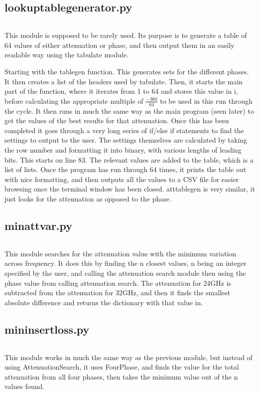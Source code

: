 \documentclass{article}
\begin{document}
\subsection{lookuptablegenerator.py}
\inputminted[linenos, breaklines]{python}{../src/lookuptablegenerator.py}
This module is supposed to be rarely used. Its purpose is to generate a table of 64 values of
either attenuation or phase, and then output them in an easily readable way using the tabulate
module. \par Starting with the tablegen function. This generates sets for the different phases. It
then creates a list of the headers used by tabulate. Then, it starts the main part of the function,
where it iterates from 1 to 64 and stores this value in i, before calculating the appropriate
multiple of $\frac{-360}{64}$ to be used in this run through the cycle. It then runs in much the
same way as the main program (seen later) to get the values of the best results for that
attenuation. Once this has been completed it goes through a very long series of if/else if
statements to find the settings to output to the user. The settings themselves are calculated by
taking the row number and formatting it into binary, with various lengths of leading bits. This
starts on line 83. The relevant values are added to the table, which is a list of lists. Once the
program has run through 64 times, it prints the table out with nice formatting, and then outputs
all the values to a CSV file for easier browsing once the terminal window has been closed.
atttablegen is very similar, it just looks for the attenuation as opposed to the phase.
\subsection{minattvar.py}
\inputminted[linenos, breaklines]{python}{../src/minattvar.py}
This module searches for the attenuation value with the minimum variation across frequency. It does
this by finding the n closest values, n being an integer specified by the user, and calling the
attenuation search module then using the phase value from calling attenuation search. The
attenuation for 24GHz is subtracted from the attenuation for 32GHz, and then it finds the smallest
absolute difference and returns the dictionary with that value in.
\subsection{mininsertloss.py}
\inputminted[linenos, breaklines]{python}{../src/mininsertloss.py}
This module works in much the same way as the previous module, but instead of using
AttenuationSearch, it uses FourPhase, and finds the value for the total attenuation from all four
phases, then takes the minimum value out of the n values found.
\end{document}
